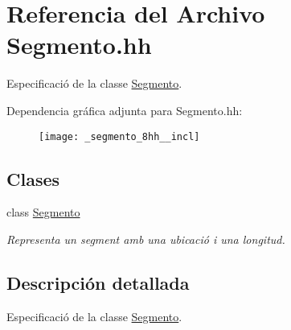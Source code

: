 \hypertarget{_segmento_8hh}{}\section{Referencia del Archivo Segmento.\+hh}
\label{_segmento_8hh}


Especificació de la classe \hyperlink{class_segmento}{Segmento}.  


Dependencia gráfica adjunta para Segmento.\+hh\+:
\nopagebreak
\begin{figure}[H]
\begin{center}
\leavevmode
\texttt{[image: \_segmento\_8hh\_\_incl]}
\end{center}
\end{figure}
\subsection*{Clases}
\begin{DoxyCompactItemize}
\item 
class \hyperlink{class_segmento}{Segmento}
\begin{DoxyCompactList}\small\item\em Representa un segment amb una ubicació i una longitud. \end{DoxyCompactList}\end{DoxyCompactItemize}


\subsection{Descripción detallada}
Especificació de la classe \hyperlink{class_segmento}{Segmento}. 


